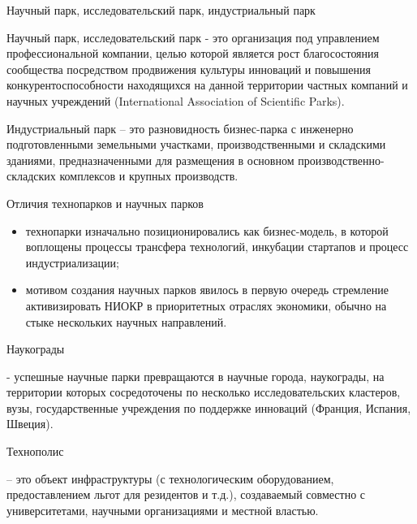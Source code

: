\documentclass[_Venture_p3.tex]{subfiles}
\begin{document}
\begin{frame}[allowframebreaks]{Научный парк, исследовательский парк, индустриальный парк }{}
\begin{block}{Научный парк, исследовательский парк}
	\quad
	- это организация под управлением профессиональной компании, целью которой является рост благосостояния сообщества посредством продвижения культуры инноваций и повышения конкурентоспособности находящихся на данной территории частных компаний и научных учреждений (International Association of Scientific Parks).	
\end{block}

\pagebreak


\begin{block}{Индустриальный парк}
	\quad
	– это разновидность бизнес-парка с инженерно подготовленными земельными участками, производственными и складскими зданиями, предназначенными для размещения в основном производственно-складских комплексов и крупных производств.
\end{block}
\end{frame}




\begin{frame}[allowframebreaks]{Отличия технопарков и научных парков}{}
\begin{itemize}
	\item технопарки изначально позиционировались как бизнес-модель, в которой воплощены процессы трансфера технологий, инкубации стартапов и процесс индустриализации; 
	
	\pagebreak
	\item мотивом создания научных парков явилось в первую очередь стремление активизировать НИОКР в приоритетных отраслях экономики, обычно на стыке нескольких научных направлений.
\end{itemize}
\end{frame}



\begin{frame}{Наукограды}
\begin{block}{}
	\quad
	- успешные научные парки превращаются в научные города, наукограды, на территории которых сосредоточены по несколько исследовательских кластеров, вузы, государственные учреждения по поддержке инноваций (Франция, Испания, Швеция).
\end{block}
\end{frame}

 
\begin{frame}{Технополис}
\begin{block}{}
	\quad
	– это объект инфраструктуры (с технологическим оборудованием, предоставлением льгот для резидентов и т.д.), создаваемый совместно с университетами, научными организациями и местной властью.
\end{block}
\end{frame}
\end{document}
